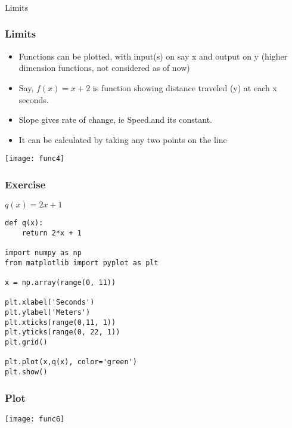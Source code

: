 
\begin{frame}[fragile]\frametitle{}
\begin{center}
{\Large Limits}
\end{center}
\end{frame}

 \begin{frame}[fragile]\frametitle{Limits}
\begin{itemize}
\item Functions can be plotted, with input(s) on say x and output on y (higher dimension functions, not considered as of now)
\item Say, $f(x) = x + 2$ is function showing distance traveled (y) at each x seconds.
\item Slope gives rate of change, ie Speed.and its constant.
\item It can be calculated by taking any two points on the line
\end{itemize}
\begin{center}
\texttt{[image: func4]}
\end{center}
\end{frame}

 \begin{frame}[fragile]\frametitle{Exercise}
$q(x) = 2x+1$

\begin{lstlisting}
def q(x):
    return 2*x + 1

import numpy as np
from matplotlib import pyplot as plt

x = np.array(range(0, 11))

plt.xlabel('Seconds')
plt.ylabel('Meters')
plt.xticks(range(0,11, 1))
plt.yticks(range(0, 22, 1))
plt.grid()

plt.plot(x,q(x), color='green')
plt.show()
\end{lstlisting}
\end{frame}


 \begin{frame}[fragile]\frametitle{Plot}
\begin{center}
\texttt{[image: func6]}
\end{center}
\end{frame}

